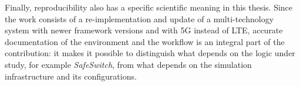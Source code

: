Finally, reproducibility also has a specific scientific meaning in this thesis. Since the work consists of a re-implementation and update of a multi-technology system with newer framework versions and with 5G instead of LTE, accurate documentation of the environment and the workflow is an integral part of the contribution: it makes it possible to distinguish what depends on the logic under study, for example \emph{SafeSwitch}, from what depends on the simulation infrastructure and its configurations.
